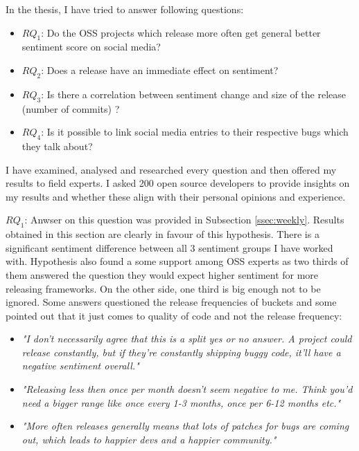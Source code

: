 
In the thesis, I have tried to answer following questions:
\begin{itemize}
\item{\textbf{$RQ_{1}$}: Do the OSS projects which release more often get general better sentiment score on social media?}
\item{\textbf{$RQ_{2}$}: Does a release have an immediate effect on sentiment?}
\item{\textbf{$RQ_{3}$}: Is there a correlation between sentiment change and size of the release (number of commits) ?}
\item{\textbf{$RQ_{4}$}: Is it possible to link social media entries to their respective bugs which they talk about?}
\end{itemize}

I have examined, analysed and researched every question and then offered my results to field experts. I asked 200 open source developers to provide insights on my results and whether these align with their personal opinions and experience.

\textbf{$RQ_{1}$}: Anwser on this question was provided in Subsection  \ref{ssec:weekly}. Results obtained in this section are clearly in favour of this hypothesis. There is a significant sentiment difference between all 3 sentiment groups I have worked with. Hypothesis also found a some support among OSS experts as two thirds of them answered the question they would expect higher sentiment for more releasing frameworks. On the other side, one third is big enough not to be ignored. Some answers questioned the release frequencies of buckets and some pointed out that it just comes to quality of code and not the release frequency:

\begin{itemize}
\item \textit{"I don't necessarily agree that this is a split yes or no answer. A project could release constantly, but if they're constantly shipping buggy code, it'll have a negative sentiment overall."}
\item \textit{"Releasing less then once per month doesn't seem negative to me. Think you'd need a bigger range like once every 1-3 months, once per 6-12 months etc."}
\item \textit{"More often releases generally means that lots of patches for bugs are coming out, which leads to happier devs and a happier community."}
\end{itemize}

